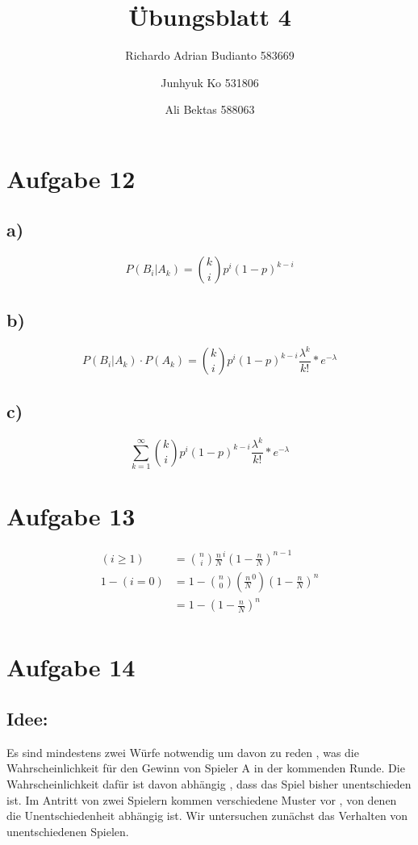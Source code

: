 \documentclass{article}
\title{Übungsblatt 4}
\author{Richardo Adrian Budianto  583669 \and Junhyuk Ko  531806 \and Ali Bektas 588063 }
\begin{document}
\maketitle



\section*{Aufgabe 12}
\subsection*{a)}
\[ P(B_i | A_k) = \binom{k}{i} p^i (1-p)^{k-i}  \]
\subsection*{b)}
\[  P(B_i | A_k) \cdot P(A_k) =  \binom{k}{i} p^i (1-p)^{k-i} \frac{\lambda^k}{k!}*e^{-\lambda}  \]
\subsection*{c)}
\[ \sum_{k=1}^{\infty} \binom{k}{i} p^i (1-p)^{k-i} \frac{\lambda^k}{k!}*e^{-\lambda}  \]

\section*{Aufgabe 13}
\begin{align*}
(i \geq 1) &= \binom{n}{i} \frac{n}{N}^i (1-\frac{n}{N})^{n-1}\\
1 - (i=0) &= 1 - \binom{n}{0}(\frac{n}{N}^0)(1-\frac{n}{N})^n\\
 	&= 1 - (1 - \frac{n}{N})^n\\
\end{align*}

\section*{Aufgabe 14}
\subsection*{Idee:}
Es sind mindestens zwei Würfe notwendig um davon zu reden , was die Wahrscheinlichkeit für den Gewinn von Spieler A in der kommenden Runde. Die Wahrscheinlichkeit dafür ist davon abhängig , dass das Spiel bisher unentschieden ist. Im Antritt von zwei Spielern kommen verschiedene Muster vor , von denen die Unentschiedenheit abhängig ist. Wir untersuchen zunächst das Verhalten von unentschiedenen Spielen. 
\end{document}
